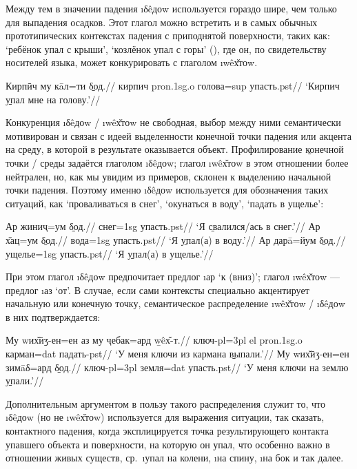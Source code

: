 Между тем в значении падения \i{δêдоw} используется гораздо шире, чем только для выпадения осадков. Этот глагол можно встретить и в самых обычных прототипических контекстах падения с приподнятой поверхности, таких как: ‘ребёнок упал с крыши’, ‘козлёнок упал с горы’ (), где он, по свидетельству носителей языка, может конкурировать с глаголом \i{wêх̌тоw}.

\begingl
\gla Кирпӣч му кāл=ти \b{δод}.//
\glc кирпич {\sc pron.1sg.o} голова={\sc sup} упасть.{\sc pst}//
\glft ‘Кирпич \b{упал} мне на голову.’//
\endgl \xe

Конкуренция \i{δêдоw} / \i{wêх̌тоw} не свободная, выбор между ними семантически мотивирован и связан с идеей выделенности конечной точки падения или акцента на среду, в которой в результате оказывается объект. Профилирование \b{конечной точки / среды} задаётся глаголом \i{δêдоw}; глагол \i{wêх̌тоw} в этом отношении более нейтрален, но, как мы увидим из примеров, склонен к выделению начальной точки падения. Поэтому именно \i{δêдоw} используется для обозначения таких ситуаций, как ‘проваливаться в снег’, ‘окунаться в воду’, ‘падать в ущелье’:

\a \begingl
\gla Ар жиниҷ=ум \b{δод}.//
 снег={\sc 1sg} упасть.{\sc pst}//
\glft ‘Я \b{свалился/ась} в снег.’//
\endgl
\a \begingl
\gla Ар х̌ац=ум \b{δод}.//
 вода={\sc 1sg} упасть.{\sc pst}//
\glft ‘Я \b{упал(а)} в воду.’//
\endgl
\a \begingl
\gla Ар дарā=йум \b{δод}.//
 ущелье={\sc 1sg} упасть.{\sc pst}//
\glft ‘Я \b{упал(а)} в ущелье.’//
\endgl \xe

При этом глагол \i{δêдоw} предпочитает предлог \i{ар} ‘к (вниз)’; глагол \i{wêх̌тоw} — предлог \i{аз} ‘от’. В случае, если сами контексты специально акцентирует начальную или конечную точку, семантическое распределение \i{wêх̌тоw} / \i{δêдоw} в них подтверждается:

\a \begingl
\gla Му wих̌ӣӡ-ен=ен аз му ҷебак=ард \b{wêх̌-т}.//
 ключ-{\sc pl=3pl} {\sc el} {\sc pron.1sg.o} карман={\sc dat} падать-{\sc pst}//
\glft ‘У меня ключи из кармана \b{выпали}.’//
\endgl 
\a \begingl
\gla Му wих̌ӣӡ-ен=ен зимāδ=ард \b{δод}.//
 ключ-{\sc pl=3pl} земля={\sc dat} упасть.{\sc pst}//
\glft ‘У меня ключи на землю \b{упали}.’//
\endgl \xe

Дополнительным аргументом в пользу такого распределения служит то, что \i{δêдоw} (но не \i{wêх̌тоw}) используется для выражения ситуации, так сказать, контактного падения, когда эксплицируется точка результирующего контакта упавшего объекта и поверхности, на которую он упал, что особенно важно в отношении живых существ, ср.~\i{упал на колени}, \i{на спину}, \i{на бок} и так далее.

